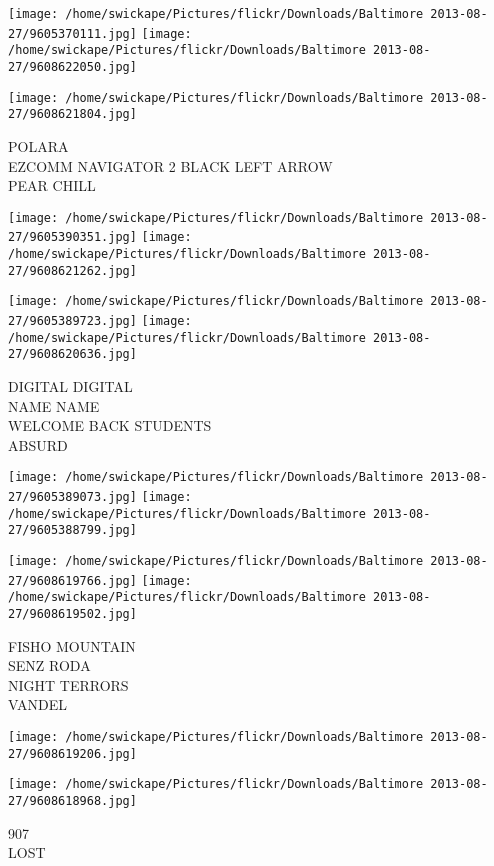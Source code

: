 \documentclass[10pt,letterpaper]{article}
\begin{document}
\texttt{[image: /home/swickape/Pictures/flickr/Downloads/Baltimore 2013-08-27/9605370111.jpg]}
\texttt{[image: /home/swickape/Pictures/flickr/Downloads/Baltimore 2013-08-27/9608622050.jpg]}

\vspace{0.25in}
\texttt{[image: /home/swickape/Pictures/flickr/Downloads/Baltimore 2013-08-27/9608621804.jpg]}

POLARA\\
EZCOMM NAVIGATOR 2 BLACK LEFT ARROW\\
PEAR CHILL
\pagebreak

\texttt{[image: /home/swickape/Pictures/flickr/Downloads/Baltimore 2013-08-27/9605390351.jpg]}
\texttt{[image: /home/swickape/Pictures/flickr/Downloads/Baltimore 2013-08-27/9608621262.jpg]}

\texttt{[image: /home/swickape/Pictures/flickr/Downloads/Baltimore 2013-08-27/9605389723.jpg]}
\texttt{[image: /home/swickape/Pictures/flickr/Downloads/Baltimore 2013-08-27/9608620636.jpg]}

DIGITAL DIGITAL\\
NAME NAME\\
WELCOME BACK STUDENTS\\
ABSURD
\pagebreak

\texttt{[image: /home/swickape/Pictures/flickr/Downloads/Baltimore 2013-08-27/9605389073.jpg]}
\texttt{[image: /home/swickape/Pictures/flickr/Downloads/Baltimore 2013-08-27/9605388799.jpg]}

\texttt{[image: /home/swickape/Pictures/flickr/Downloads/Baltimore 2013-08-27/9608619766.jpg]}
\texttt{[image: /home/swickape/Pictures/flickr/Downloads/Baltimore 2013-08-27/9608619502.jpg]}

FISHO MOUNTAIN\\
SENZ RODA\\
NIGHT TERRORS\\
VANDEL
\pagebreak

\texttt{[image: /home/swickape/Pictures/flickr/Downloads/Baltimore 2013-08-27/9608619206.jpg]}

\vspace{0.25in}
\texttt{[image: /home/swickape/Pictures/flickr/Downloads/Baltimore 2013-08-27/9608618968.jpg]}

907\\
LOST
\pagebreak
\end{document}
